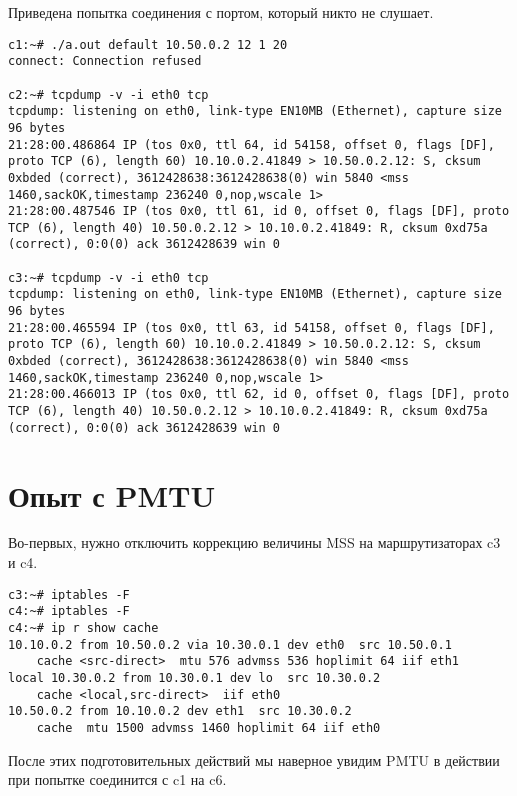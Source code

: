 \documentclass[a4paper,12pt]{article}
\begin{document}
Приведена попытка соединения с портом, который никто не слушает.
\begin{lstlisting}
c1:~# ./a.out default 10.50.0.2 12 1 20
connect: Connection refused

c2:~# tcpdump -v -i eth0 tcp
tcpdump: listening on eth0, link-type EN10MB (Ethernet), capture size 96 bytes
21:28:00.486864 IP (tos 0x0, ttl 64, id 54158, offset 0, flags [DF], proto TCP (6), length 60) 10.10.0.2.41849 > 10.50.0.2.12: S, cksum 0xbded (correct), 3612428638:3612428638(0) win 5840 <mss 1460,sackOK,timestamp 236240 0,nop,wscale 1>
21:28:00.487546 IP (tos 0x0, ttl 61, id 0, offset 0, flags [DF], proto TCP (6), length 40) 10.50.0.2.12 > 10.10.0.2.41849: R, cksum 0xd75a (correct), 0:0(0) ack 3612428639 win 0

c3:~# tcpdump -v -i eth0 tcp
tcpdump: listening on eth0, link-type EN10MB (Ethernet), capture size 96 bytes
21:28:00.465594 IP (tos 0x0, ttl 63, id 54158, offset 0, flags [DF], proto TCP (6), length 60) 10.10.0.2.41849 > 10.50.0.2.12: S, cksum 0xbded (correct), 3612428638:3612428638(0) win 5840 <mss 1460,sackOK,timestamp 236240 0,nop,wscale 1>
21:28:00.466013 IP (tos 0x0, ttl 62, id 0, offset 0, flags [DF], proto TCP (6), length 40) 10.50.0.2.12 > 10.10.0.2.41849: R, cksum 0xd75a (correct), 0:0(0) ack 3612428639 win 0
\end{lstlisting}

\section{Опыт с PMTU}

Во-первых, нужно отключить коррекцию величины MSS на маршрутизаторах c3 и c4.
\begin{lstlisting}
c3:~# iptables -F
c4:~# iptables -F
c4:~# ip r show cache
10.10.0.2 from 10.50.0.2 via 10.30.0.1 dev eth0  src 10.50.0.1 
    cache <src-direct>  mtu 576 advmss 536 hoplimit 64 iif eth1
local 10.30.0.2 from 10.30.0.1 dev lo  src 10.30.0.2 
    cache <local,src-direct>  iif eth0
10.50.0.2 from 10.10.0.2 dev eth1  src 10.30.0.2 
    cache  mtu 1500 advmss 1460 hoplimit 64 iif eth0
\end{lstlisting}

После этих подготовительных действий мы наверное увидим PMTU в действии при попытке соединится с c1 на c6.
\end{document}
